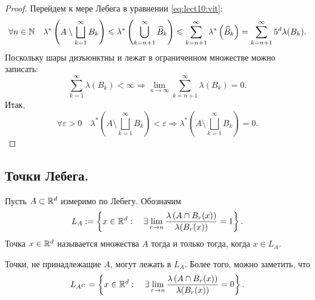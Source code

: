 \begin{theorem}
\begin{proof}
        Перейдем к мере Лебега в уравнении \eqref{eq:lect10:vit}:
        \[
            \forall n\in\mathbb{N} \quad \lambda^*\left(A\setminus\bigsqcup_{k=1}^{\infty}B_k\right)
            \leqslant\lambda^*\left(\bigcup_{k=n+1}^{\infty}\widehat{B}_k\right)
            \leqslant\sum_{k=n+1}^{\infty}\lambda^*\left(\widehat{B}_k\right)
            =\sum_{k=n+1}^{\infty}5^d\lambda(B_k).
        \]
        Поскольку шары дизъюнктны и лежат в ограниченном множестве можно записать:
        \[
            \sum_{k=1}^{\infty}\lambda(B_k)<\infty\Rightarrow\lim_{n\to\infty}
            \sum_{k=n+1}^{\infty}\lambda(B_k)=0.
        \]
        Итак,
        \[
            \forall \varepsilon>0\quad \lambda^*\left(A\setminus\bigsqcup_{k=1}^{\infty}B_k\right)<
            \varepsilon\Rightarrow\lambda^*\left(A\setminus\bigsqcup_{k=1}^{\infty}B_k\right)=0.
        \]

    \end{proof}
\end{theorem}

\subsection{Точки Лебега.}

\begin{definition}
    Пусть $A\subset\mathbb{R}^d$ измеримо по Лебегу. Обозначим
    \[
        L_A:=\left\{x\in\mathbb{R}^d:\quad \exists\lim_{r\to n}\dfrac{\lambda\left(A\cap B_r(x)
            \right)}{\lambda(B_r(x))}=1\right\}.
    \]
    Точка $x\in\mathbb{R}^d$ называется  множества $A$ тогда и только тогда, когда
    $x\in L_A$.

    \begin{remark}
        Точки, не принадлежащие $A$, могут лежать в $L_A$. Более того, можно заметить, что
        \[
            L_{A^C}=\left\{x\in\mathbb{R}^d:\quad \exists\lim_{r\to n}\dfrac{\lambda\left(A\cap B_r(x)
                \right)}{\lambda(B_r(x))}=0\right\}.
        \]
    \end{remark}
\end{definition}

